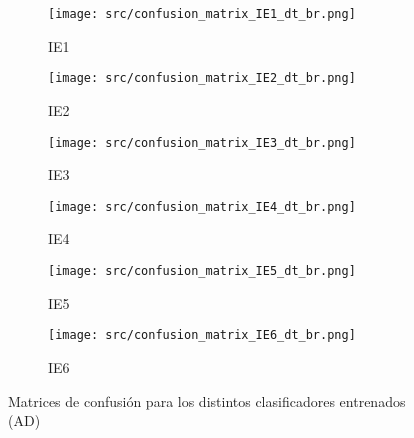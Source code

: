 \linebreak
\begin{figure}[H]
	\centering
	\begin{subfigure}[b]{0.3\textwidth}
		\centering
		\texttt{[image: src/confusion\_matrix\_IE1\_dt\_br.png]}
		\caption{IE1}
	\end{subfigure}
	\hfill
	\begin{subfigure}[b]{0.3\textwidth}
		\centering
		\texttt{[image: src/confusion\_matrix\_IE2\_dt\_br.png]}
		\caption{IE2}
	\end{subfigure}
	\hfill
	\begin{subfigure}[b]{0.3\textwidth}
		\centering
		\texttt{[image: src/confusion\_matrix\_IE3\_dt\_br.png]}
		\caption{IE3}
	\end{subfigure}
	\hfill
	\begin{subfigure}[b]{0.3\textwidth}
		\centering
		\texttt{[image: src/confusion\_matrix\_IE4\_dt\_br.png]}
		\caption{IE4}
	\end{subfigure}
	\hfill
	\begin{subfigure}[b]{0.3\textwidth}
		\centering
		\texttt{[image: src/confusion\_matrix\_IE5\_dt\_br.png]}
		\caption{IE5}
	\end{subfigure}
	\hfill
	\begin{subfigure}[b]{0.3\textwidth}
		\centering
		\texttt{[image: src/confusion\_matrix\_IE6\_dt\_br.png]}
		\caption{IE6}
	\end{subfigure}
	\caption{Matrices de confusión para los distintos clasificadores entrenados (AD)}
	\label{fig:ml_conf_matrix_dt}
\end{figure}
\pagebreak
